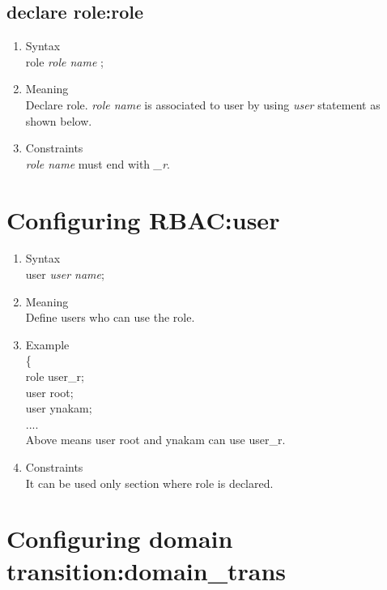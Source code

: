 \documentclass{article}
\begin{document}
\subsection{declare role:role}
\begin{enumerate}
 \item Syntax\\
    role {\it  role name } ;
 \item Meaning\\
     Declare role.  {\it  role name } is associated to user by using
       {\it user} statement as shown below.
 \item Constraints\\
       {\it role name} must end with {\it \_r}.
\end{enumerate}

\section{Configuring RBAC:user}
\begin{enumerate}
 \item Syntax\\
       user {\it user name};
 \item Meaning\\
       Define users who can use the role. 
 \item Example\\
       \{\\
       role user\_r;\\
       user root;\\
       user ynakam;\\
       ....\\
Above means user root and ynakam can use user\_r.
\item Constraints\\
       It can be used only section where role is declared. 

\end{enumerate}

\section{Configuring domain transition:domain\_trans}
\end{document}
